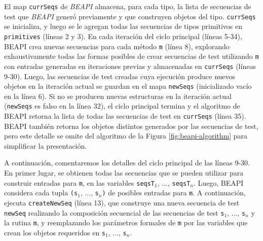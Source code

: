 El map \texttt{currSeqs} de \emph{BEAPI} almacena, para cada tipo, 
la lista de secuencias de test que \emph{BEAPI} generó previamente y que
construyen objetos del tipo. 
\texttt{currSeqs} se inicializa, y luego se le agregan todas las
secuencias de tipos primitivos en \texttt{primitives} (líneas 2 y 3). 
En cada iteración del ciclo principal (líneas 5-34), \textsf{BEAPI} crea nuevas
secuencias para cada método \texttt{m} (línea 8), explorando exhaustivamente
todas las formas posibles de crear secuencias de test utilizando \texttt{m} con
entradas generadas en iteraciones previas y almacenadas en \texttt{currSeqs}
(líneas 9-30).
Luego, las secuencias de test creadas cuya ejecución produce nuevos objetos en
la iteración actual se guardan en el mapa \texttt{newSeqs} (inicializado vacío en la línea 6). 
Si no se producen nuevas estructuras en la iteración actual (\texttt{newSeqs} es
falso en la línea 32), el ciclo principal 
termina y el algoritmo de \textsf{BEAPI} retorna la lista de todas las
secuencias de test en \texttt{currSeqs} (línea 35). \textsf{BEAPI} también
retorna los objetos distintos generados por las secuencias de test, 
pero este detalle se omite del algoritmo de la Figura \ref{fig:beapi-algorithm} 
para simplificar la presentación.

A continuación, comentaremos los detalles del ciclo principal de las líneas 9-30. 
En primer lugar, se obtienen todas las secuencias que se pueden utilizar para
construir entradas para \texttt{m}, en las variables \texttt{seqsT$_1$}, ...,
\texttt{seqsT$_n$}. Luego, \textsf{BEAPI} considera cada tupla \texttt{(s$_1$},
..., \texttt{s$_n$)} de posibles entradas para \texttt{m}.
A continuación, ejecuta \texttt{createNewSeq} (línea 13), que construye una
nueva secuencia de test \texttt{newSeq} realizando la composición secuencial de
las secuencias de test \texttt{s$_1$}, ..., \texttt{s$_n$} y la rutina \texttt{m}, 
y reemplazando los parámetros formales de \texttt{m} por las variables que crean los objetos requeridos en \texttt{s$_1$}, ..., \texttt{s$_n$}. 

